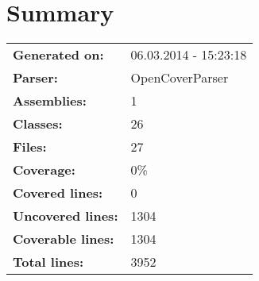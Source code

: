 \documentclass[a4paper,10pt]{article}
\begin{document}
\setcounter{secnumdepth}{-1}
\section{Summary}
\begin{longtable}[l]{ll}
\textbf{Generated on:} & 06.03.2014 - 15:23:18\\
\textbf{Parser:} & OpenCoverParser\\
\textbf{Assemblies:} & 1\\
\textbf{Classes:} & 26\\
\textbf{Files:} & 27\\
\textbf{Coverage:} & 0\%\\
\textbf{Covered lines:} & 0\\
\textbf{Uncovered lines:} & 1304\\
\textbf{Coverable lines:} & 1304\\
\textbf{Total lines:} & 3952\\
\end{longtable}
\end{document}
